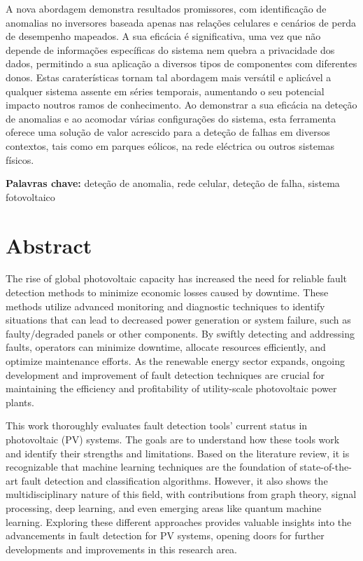 A nova abordagem demonstra resultados promissores, com identificação de anomalias no inversores baseada apenas nas relações celulares e cenários de perda de desempenho mapeados. A sua eficácia é significativa, uma vez que não depende de informações específicas do sistema nem quebra a privacidade dos dados, permitindo a sua aplicação a diversos tipos de componentes com diferentes donos. Estas caraterísticas tornam tal abordagem mais versátil e aplicável a qualquer sistema assente em séries temporais, aumentando o seu potencial impacto noutros ramos de conhecimento. Ao demonstrar a sua eficácia na deteção de anomalias e ao acomodar várias configurações do sistema, esta ferramenta oferece uma solução de valor acrescido para a deteção de falhas em diversos contextos, tais como em parques eólicos, na rede eléctrica ou outros sistemas físicos.

\bigskip

\textbf{Palavras chave:} deteção de anomalia, rede celular, deteção de falha, sistema fotovoltaico

\chapter*{Abstract}
The rise of global photovoltaic capacity has increased the need for reliable fault detection methods to minimize economic losses caused by downtime. These methods utilize advanced monitoring and diagnostic techniques to identify situations that can lead to decreased power generation or system failure, such as faulty/degraded panels or other components. By swiftly detecting and addressing faults, operators can minimize downtime, allocate resources efficiently, and optimize maintenance efforts. As the renewable energy sector expands, ongoing development and improvement of fault detection techniques are crucial for maintaining the efficiency and profitability of utility-scale photovoltaic power plants.

This work thoroughly evaluates fault detection tools' current status in photovoltaic (PV) systems. The goals are to understand how these tools work and identify their strengths and limitations. Based on the literature review, it is recognizable that machine learning techniques are the foundation of state-of-the-art fault detection and classification algorithms. However, it also shows the multidisciplinary nature of this field, with contributions from graph theory, signal processing, deep learning, and even emerging areas like quantum machine learning. Exploring these different approaches provides valuable insights into the advancements in fault detection for PV systems, opening doors for further developments and improvements in this research area.

